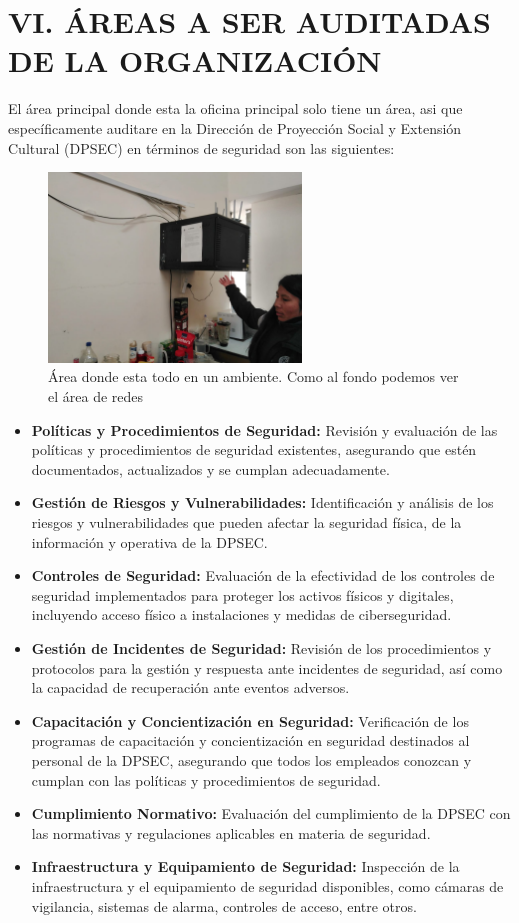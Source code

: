 \documentclass[12pt,a4paper]{article}
\begin{document}
\section{VI. ÁREAS A SER AUDITADAS DE LA ORGANIZACIÓN}
El área principal donde esta la oficina principal solo tiene un área, asi que específicamente auditare en la Dirección de Proyección Social y Extensión Cultural (DPSEC) en términos de seguridad son las siguientes:
\begin{figure}[!htb]
    \centering
    \includegraphics[width=0.6\textwidth]{images/equipo5.jpeg}
    \caption{Área donde esta todo en un ambiente. Como al fondo podemos ver el área de redes}
    
\end{figure}
\begin{itemize}
    \item \textbf{Políticas y Procedimientos de Seguridad:} Revisión y evaluación de las políticas y procedimientos de seguridad existentes, asegurando que estén documentados, actualizados y se cumplan adecuadamente.
    \item \textbf{Gestión de Riesgos y Vulnerabilidades:} Identificación y análisis de los riesgos y vulnerabilidades que pueden afectar la seguridad física, de la información y operativa de la DPSEC.
    \item \textbf{Controles de Seguridad:} Evaluación de la efectividad de los controles de seguridad implementados para proteger los activos físicos y digitales, incluyendo acceso físico a instalaciones y medidas de ciberseguridad.
    \item \textbf{Gestión de Incidentes de Seguridad:} Revisión de los procedimientos y protocolos para la gestión y respuesta ante incidentes de seguridad, así como la capacidad de recuperación ante eventos adversos.
    \item \textbf{Capacitación y Concientización en Seguridad:} Verificación de los programas de capacitación y concientización en seguridad destinados al personal de la DPSEC, asegurando que todos los empleados conozcan y cumplan con las políticas y procedimientos de seguridad.
    \item \textbf{Cumplimiento Normativo:} Evaluación del cumplimiento de la DPSEC con las normativas y regulaciones aplicables en materia de seguridad.
    \item \textbf{Infraestructura y Equipamiento de Seguridad:} Inspección de la infraestructura y el equipamiento de seguridad disponibles, como cámaras de vigilancia, sistemas de alarma, controles de acceso, entre otros.
    
\end{itemize}
\end{document}
